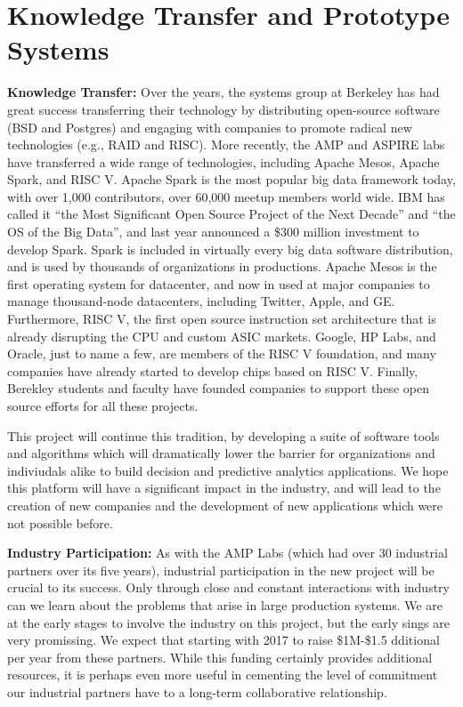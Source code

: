 \section{Knowledge Transfer and Prototype Systems}

{\bf Knowledge Transfer:} Over the years, the systems group at Berkeley has had great success transferring their technology by distributing open-source software (\eg BSD and Postgres) and engaging with companies to promote radical new technologies (e.g., RAID and RISC).  More recently, the AMP and ASPIRE labs have transferred a wide range of technologies, including Apache Mesos, Apache Spark, and RISC V. Apache Spark is the most popular big data framework today, with over 1,000 contributors, over 60,000 meetup members world wide. IBM has called it ``the Most Significant Open Source Project of the Next Decade'' and ``the OS of the Big Data'', and last year announced a \$300 million investment to develop Spark. Spark is included in virtually every big data software distribution, and is used by thousands of organizations in productions. Apache Mesos is the first operating system for datacenter, and now in used at major companies to manage thousand-node datacenters, including Twitter, Apple, and GE.  Furthermore, RISC V, the first open source instruction set architecture that is already disrupting the CPU and custom ASIC markets. Google, HP Labs, and Oracle, just to name a few, are members of the RISC V foundation, and many companies have already started to develop chips based on RISC V. Finally, Berekley students and faculty have founded companies to support these open source efforts for all these projects.

This project will continue this tradition, by developing a suite of software tools and algorithms which will dramatically lower the barrier for organizations and indiviudals alike to build decision and predictive analytics applications. We hope this platform will have a significant impact in the industry, and will lead to the creation of new companies and the development of new applications which were not possible before.


{\bf Industry Participation:} As with the AMP  Labs (which had over 30 industrial partners over its five years), industrial participation in the new project will be crucial to its success.  Only through close and constant interactions with industry can we learn about the problems that arise in large production systems.  We are at the early stages to involve the industry on this project, but the early sings are very promissing. We expect that starting with 2017 to raise \$1M-\$1.5 dditional per year from these partners. While this funding certainly provides additional resources, it is perhaps even more useful in cementing the level of commitment our industrial partners have to a long-term collaborative relationship.

